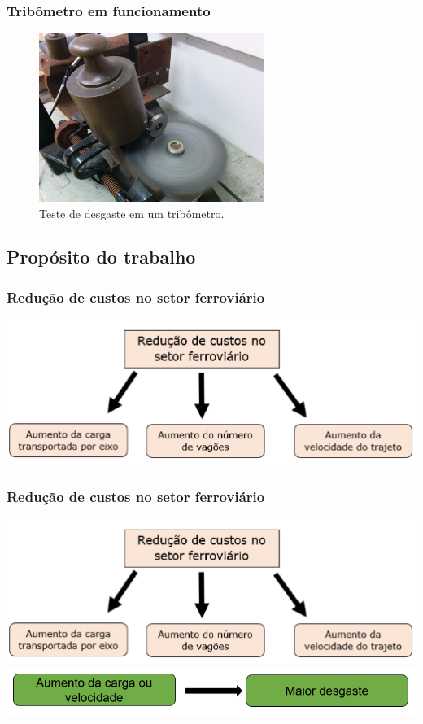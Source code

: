 \documentclass{beamer}
\begin{document}
\begin{frame}
\frametitle{Tribômetro em funcionamento}
\begin{figure}
	\centering
	\includegraphics[width=0.65\textwidth]{tribometro}
	\caption{Teste de desgaste em um tribômetro.}
	\label{fig:tribometro}
\end{figure}
\end{frame}


\subsection{Propósito do trabalho}

\begin{frame}
\frametitle{Redução de custos no setor ferroviário}
	\centering
	\includegraphics[width=1\textwidth]{custos}
\end{frame}

\begin{frame}
\frametitle{Redução de custos no setor ferroviário}
\centering
\includegraphics[width=1\textwidth]{custos}
\hfill
\includegraphics[width=1\textwidth]{custos2}
\end{frame}
\end{document}
